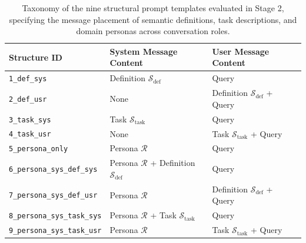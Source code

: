 \begin{table}[t]
	\centering
	\caption{Taxonomy of the nine structural prompt templates evaluated in Stage 2, specifying the message placement of semantic definitions, task descriptions, and domain personas across conversation roles.}
	\label{tab:stage2_structures}
	\begin{tabular}{lll}
		\toprule
		\textbf{Structure ID} & \textbf{System Message Content} & \textbf{User Message Content} \\
		\midrule
		\texttt{1\_def\_sys}            & Definition $\mathcal{S}_{\text{def}}$         & Query \\
		\texttt{2\_def\_usr}            & None                                          & Definition $\mathcal{S}_{\text{def}}$ + Query \\
		\texttt{3\_task\_sys}           & Task $\mathcal{S}_{\text{task}}$              & Query \\
		\texttt{4\_task\_usr}           & None                                          & Task $\mathcal{S}_{\text{task}}$ + Query \\
		\texttt{5\_persona\_only}       & Persona $\mathcal{R}$                         & Query \\
		\texttt{6\_persona\_sys\_def\_sys} & Persona $\mathcal{R}$ + Definition $\mathcal{S}_{\text{def}}$ & Query \\
		\texttt{7\_persona\_sys\_def\_usr} & Persona $\mathcal{R}$                         & Definition $\mathcal{S}_{\text{def}}$ + Query \\
		\texttt{8\_persona\_sys\_task\_sys}& Persona $\mathcal{R}$ + Task $\mathcal{S}_{\text{task}}$       & Query \\
		\texttt{9\_persona\_sys\_task\_usr}& Persona $\mathcal{R}$                         & Task $\mathcal{S}_{\text{task}}$ + Query \\
		\bottomrule
	\end{tabular}
\end{table}

